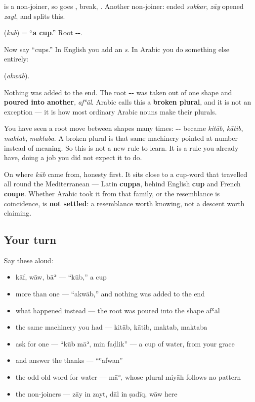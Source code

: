 \textbf{} is a non-joiner, so \textbf{} goes \textbf{}, break, \textbf{}. Another non-joiner: \textbf{} ended \emph{sukkar}, \emph{zāy} opened \emph{zayt}, and \textbf{} splits this.

\begin{cousinweb}
\textbf{} (\emph{kūb}) = \textquotedblleft{}\textbf{a cup}.\textquotedblright{} Root \textbf{--}.

Now say \textquotedblleft{}cups.\textquotedblright{} In English you add an \emph{s}. In Arabic you do something else entirely:

\textbf{} (\emph{akwāb}).

Nothing was added to the end. The root \textbf{--} was taken out of one shape and \textbf{poured into another}, \emph{afʿāl}. Arabic calls this a \textbf{broken plural}, and it is not an exception — it is how most ordinary Arabic nouns make their plurals.

You have seen a root move between shapes many times: \textbf{--} became \emph{kitāb}, \emph{kātib}, \emph{maktab}, \emph{maktaba}. A broken plural is that same machinery pointed at number instead of meaning. So this is not a new rule to learn. It is a rule you already have, doing a job you did not expect it to do.

On where \emph{kūb} came from, honesty first. It sits close to a cup-word that travelled all round the Mediterranean — Latin \textbf{cuppa}, behind English \textbf{cup} and French \textbf{coupe}. Whether Arabic took it from that family, or the resemblance is coincidence, is \textbf{not settled}: a resemblance worth knowing, not a descent worth claiming.
\end{cousinweb}

\subsection*{Your turn}
Say these aloud:

\begin{itemize}
\raggedright
  \item kāf, wāw, bāʾ — \textquotedblleft{}kūb,\textquotedblright{} a cup
  \item more than one — \textquotedblleft{}akwāb,\textquotedblright{} and nothing was added to the end
  \item what happened instead — the root was poured into the shape afʿāl
  \item the same machinery you had — kitāb, kātib, maktab, maktaba
  \item ask for one — \textquotedblleft{}kūb māʾ, min faḍlik\textquotedblright{} — a cup of water, from your grace
  \item and answer the thanks — \textquotedblleft{}ʿafwan\textquotedblright{}
  \item the odd old word for water — māʾ, whose plural miyāh follows no pattern
  \item the non-joiners — zāy in zayt, dāl in ṣadīq, wāw here
\end{itemize}

